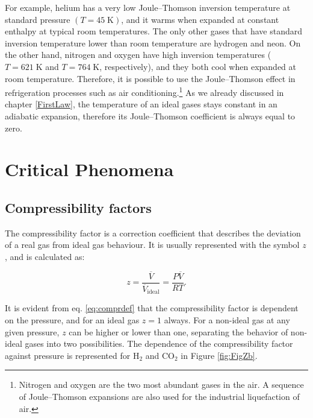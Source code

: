 \documentclass[
  9pt,
]{extbook}
\theoremstyle{definition}
\theoremstyle{definition}
\theoremstyle{definition}
\theoremstyle{definition}
\theoremstyle{remark}
\begin{document}
For example, helium has a very low Joule--Thomson inversion temperature at standard pressure \((T=45\;\text{K})\), and it warms when expanded at constant enthalpy at typical room temperatures. The only other gases that have standard inversion temperature lower than room temperature are hydrogen and neon. On the other hand, nitrogen and oxygen have high inversion temperatures (\(T=621\;\text{K}\) and \(T=764\;\text{K}\), respectively), and they both cool when expanded at room temperature. Therefore, it is possible to use the Joule--Thomson effect in refrigeration processes such as air conditioning.\footnote{Nitrogen and oxygen are the two most abundant gases in the air. A sequence of Joule--Thomson expansions are also used for the industrial liquefaction of air.} As we already discussed in chapter \ref{FirstLaw}, the temperature of an ideal gases stays constant in an adiabatic expansion, therefore its Joule--Thomson coefficient is always equal to zero.

\section{Critical Phenomena}\label{critical-phenomena}

\subsection{Compressibility factors}\label{compressibility-factors}

The compressibility factor is a correction coefficient that describes the deviation of a real gas from ideal gas behaviour. It is usually represented with the symbol \(z\), and is calculated as:

\begin{equation}
z=\frac{\overline{V}}{\overline{V}_{\text{ideal}}} = \frac{P \overline{V}}{RT}.
\label{eq:comprdef}
\end{equation}

It is evident from eq. \eqref{eq:comprdef} that the compressibility factor is dependent on the pressure, and for an ideal gas \(z=1\) always. For a non-ideal gas at any given pressure, \(z\) can be higher or lower than one, separating the behavior of non-ideal gases into two possibilities. The dependence of the compressibility factor against pressure is represented for \(\mathrm{H}_2\) and \(\mathrm{CO}_2\) in Figure \ref{fig:FigZb}.
\end{document}
